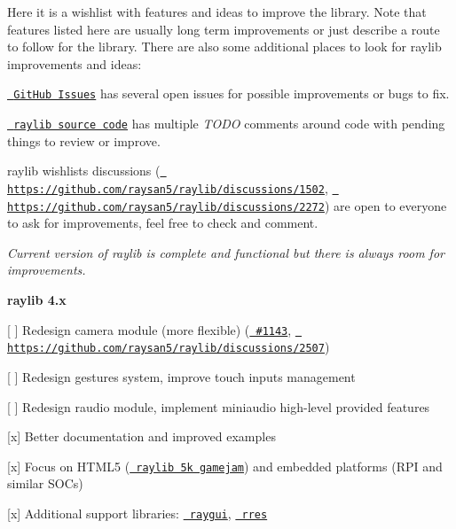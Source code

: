 Here it is a wishlist with features and ideas to improve the library. Note that features listed here are usually long term improvements or just describe a route to follow for the library. There are also some additional places to look for raylib improvements and ideas\+:


\begin{DoxyItemize}
\item \href{https://github.com/raysan5/raylib/issues}{\texttt{ Git\+Hub Issues}} has several open issues for possible improvements or bugs to fix.
\item \href{https://github.com/raysan5/raylib/tree/master/src}{\texttt{ raylib source code}} has multiple {\itshape TODO} comments around code with pending things to review or improve.
\item raylib wishlists discussions (\href{https://github.com/raysan5/raylib/discussions/1502}{\texttt{ https\+://github.\+com/raysan5/raylib/discussions/1502}}, \href{https://github.com/raysan5/raylib/discussions/2272}{\texttt{ https\+://github.\+com/raysan5/raylib/discussions/2272}}) are open to everyone to ask for improvements, feel free to check and comment.
\end{DoxyItemize}

{\itshape Current version of raylib is complete and functional but there is always room for improvements.}

{\bfseries{raylib 4.\+x}}
\begin{DoxyItemize}
\item \mbox{[} \mbox{]} Redesign camera module (more flexible) (\href{https://github.com/raysan5/raylib/issues/1143}{\texttt{ \#1143}}, \href{https://github.com/raysan5/raylib/discussions/2507}{\texttt{ https\+://github.\+com/raysan5/raylib/discussions/2507}})
\item \mbox{[} \mbox{]} Redesign gestures system, improve touch inputs management
\item \mbox{[} \mbox{]} Redesign raudio module, implement miniaudio high-\/level provided features
\item \mbox{[}x\mbox{]} Better documentation and improved examples
\item \mbox{[}x\mbox{]} Focus on HTML5 (\href{https://itch.io/jam/raylib-5k-gamejam}{\texttt{ raylib 5k gamejam}}) and embedded platforms (RPI and similar SOCs)
\item \mbox{[}x\mbox{]} Additional support libraries\+: \href{https://github.com/raysan5/raygui}{\texttt{ raygui}}, \href{https://github.com/raysan5/rres}{\texttt{ rres}}
\end{DoxyItemize}

